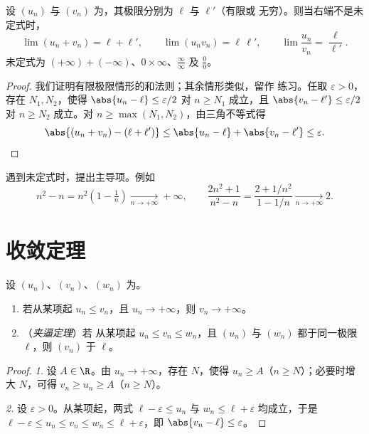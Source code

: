 \begin{proposition}[极限的运算]\label{prop:g12:seq:operations}
设 $(u_n)$ 与 $(v_n)$ 为，其极限分别为 $\ell$ 与 $\ell'$（有限或
无穷）。则当右端不是未定式时，
\[
\lim (u_n + v_n) = \ell + \ell', \qquad
\lim (u_n v_n) = \ell\,\ell', \qquad
\lim \frac{u_n}{v_n} = \frac{\ell}{\ell'}.
\]
未定式为
$(+\infty) + (-\infty)$、$0 \times \infty$、$\frac{\infty}{\infty}$ 及
$\frac{0}{0}$。
\end{proposition}

\begin{proof}
我们证明有限极限情形的和法则；其余情形类似，留作
练习。任取 $\varepsilon > 0$，存在 $N_1, N_2$，使得
$\abs{u_n - \ell} \leq \varepsilon/2$ 对 $n \geq N_1$ 成立，且
$\abs{v_n - \ell'} \leq \varepsilon/2$ 对 $n \geq N_2$ 成立。对
$n \geq \max(N_1, N_2)$，由三角不等式得
\[
\abs{(u_n + v_n) - (\ell + \ell')}
\leq \abs{u_n - \ell} + \abs{v_n - \ell'} \leq \varepsilon. \qedhere
\]
\end{proof}

\begin{method}[提取主导项处理未定式]\label{met:g12:seq:indeterminate}
遇到未定式时，提出主导项。例如
\[
n^2 - n = n^2\left(1 - \tfrac{1}{n}\right) \xrightarrow[n\to+\infty]{} +\infty,
\qquad
\frac{2n^2+1}{n^2 - n} = \frac{2 + 1/n^2}{1 - 1/n}
\xrightarrow[n\to+\infty]{} 2 .
\]
\end{method}

\section{收敛定理}

\begin{theorem}[比较定理与夹逼定理]\label{thm:g12:seq:squeeze}
设 $(u_n)$、$(v_n)$、$(w_n)$ 为。
\begin{enumerate}
  \item 若从某项起 $u_n \leq v_n$，且 $u_n \to +\infty$，则
        $v_n \to +\infty$。
  \item （\emph{夹逼定理}）若
        从某项起 $u_n \leq v_n \leq w_n$，且 $(u_n)$ 与 $(w_n)$
        都于同一极限 $\ell$，则 $(v_n)$ 
        于 $\ell$。
\end{enumerate}
\end{theorem}

\begin{proof}
\emph{1.} 设 $A \in \R$。由 $u_n \to +\infty$，存在 $N$，使得
$u_n \geq A$（$n \geq N$）；必要时增大 $N$，可得
$v_n \geq u_n \geq A$（$n \geq N$）。

\emph{2.} 设 $\varepsilon > 0$。从某项起，两式
$\ell - \varepsilon \leq u_n$ 与 $w_n \leq \ell + \varepsilon$ 均成立，于是
$\ell - \varepsilon \leq u_n \leq v_n \leq w_n \leq \ell + \varepsilon$，即
$\abs{v_n - \ell} \leq \varepsilon$。
\end{proof}


